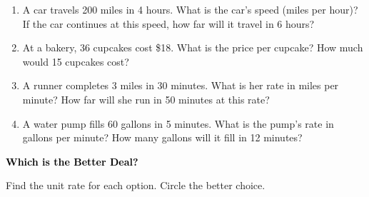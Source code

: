 \documentclass[12pt, letterpaper, fleqn]{article}
\begin{document}
\vspace{3mm}

\begin{enumerate}[itemsep=2cm, leftmargin=0.6cm]
\item A car travels 200 miles in 4 hours. What is the car's speed (miles per hour)? If the car continues at this speed, how far will it travel in 6 hours?\\
\vspace{2cm}

\item At a bakery, 36 cupcakes cost \$18. What is the price per cupcake? How much would 15 cupcakes cost?\\
\vspace{2cm}

\item A runner completes 3 miles in 30 minutes. What is her rate in miles per minute? How far will she run in 50 minutes at this rate?\\
\vspace{2cm}

\item A water pump fills 60 gallons in 5 minutes. What is the pump's rate in gallons per minute? How many gallons will it fill in 12 minutes?\\
\vspace{2.5cm}

\end{enumerate}

\newpage

\begin{tcolorbox}[colback=customteal!20]
\large\textcolor{black}{\textbf{Which is the Better Deal?}}
\end{tcolorbox}

\noindent
Find the unit rate for each option. Circle the better choice.

\vspace{3mm}
\end{document}

